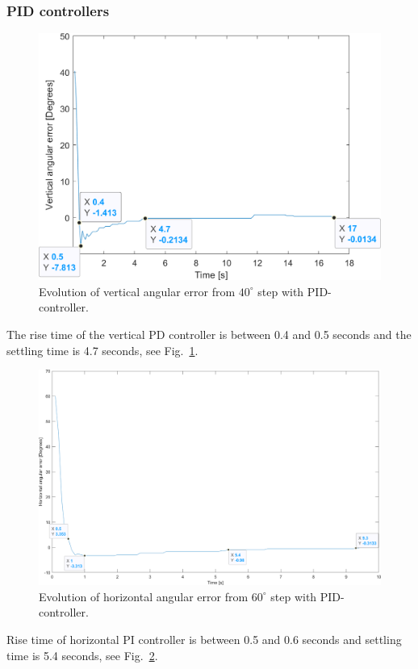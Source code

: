 \subsubsection{PID controllers}
\label{sec:simon15}
\begin{figure}[h]
\centering
\includegraphics[width=\linewidth]{sections/assets/Vertical_PID_controller.png}
\caption{Evolution of vertical angular error from \(40^{\circ}\) step with PID-controller.}
\label{vert_PID}
\end{figure}
The rise time of the vertical PD controller is between 0.4 and 0.5 seconds and the settling time is 4.7 seconds, see Fig.~\ref{vert_PID}.
\begin{figure}[h]
\centering
\includegraphics[width=\linewidth]{sections/assets/Horizontal_PID_controller.png}
\caption{Evolution of horizontal angular error from \(60^{\circ}\) step with PID-controller.}
\label{Horizontal_PID}
\end{figure}
Rise time of horizontal PI controller is between 0.5 and 0.6 seconds and settling time is 5.4 seconds, see Fig.~\ref{Horizontal_PID}.

